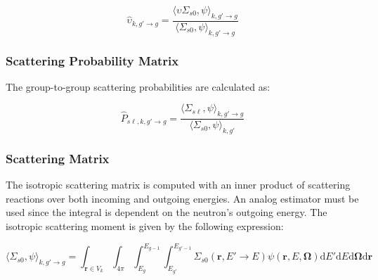 \begin{equation}
\label{eqn:scatt-mult-mat}
\hat{\upsilon}_{k,g'\rightarrow g} = \frac{{\langle \upsilon \Sigma_{s0}, \psi \rangle}_{k,g'\rightarrow g}}{{\langle \Sigma_{s0}, \psi \rangle}_{k,g'\rightarrow g}}
\end{equation}

\subsubsection{Scattering Probability Matrix}
\label{subsubsec:tally-types-scatt-prob-mat}

The group-to-group scattering probabilities are calculated as:

%

\begin{equation}
\label{eqn:scatt-prob-mat}
\hat{P}_{s\ell,k,g'\rightarrow g} = \frac{{\langle \Sigma_{s\ell}, \psi \rangle}_{k,g'\rightarrow g}}{{\langle \Sigma_{s0}, \psi \rangle}_{k,g'}}
\end{equation}


\subsubsection{Scattering Matrix}
\label{subsubsec:tally-types-scatt-mat}

The isotropic scattering matrix is computed with an inner product of scattering reactions over both incoming and outgoing energies. An analog estimator must be used since the integral is dependent on the neutron's outgoing energy. The isotropic scattering moment is given by the following expression:

\begin{equation}
\label{eqn:sigs0}
\langle \Sigma_{s0}, \psi \rangle_{k,g'\rightarrow g} = \int_{\mathbf{r} \in V_{k}} \int_{4\pi} \int_{E_{g}}^{E_{g-1}} \int_{E_{g'}}^{E_{g'-1}} \Sigma_{s0}(\mathbf{r},E'\rightarrow E)\psi(\mathbf{r},E,\mathbf{\Omega}) \mathrm{d}E'\mathrm{d}E\mathrm{d}\mathbf{\Omega}\mathrm{d}\mathbf{r}
\end{equation}

